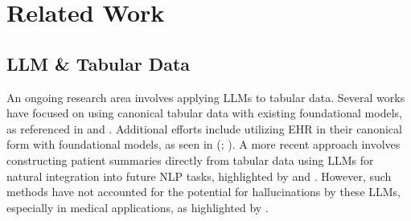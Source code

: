 \documentclass[pmlr]{jmlr}%
\begin{document}


\section{Related Work}

\subsection{LLM \& Tabular Data}

An ongoing research area involves applying LLMs to tabular data. Several works have focused on using canonical tabular data with existing foundational models, as referenced in \citep{zhang2023towards} and \citep{slack2023tablet}. Additional efforts include utilizing EHR in their canonical form with foundational models, as seen in (\cite{shi2024ehragent}; \cite{wang2023meditab}). A more recent approach involves constructing patient summaries directly from tabular data using LLMs for natural integration into future NLP tasks, highlighted by \citep{ellershaw2024automated} and \citep{hegselmann2024data}. However, such methods have not accounted for the potential for hallucinations by these LLMs, especially in medical applications, as highlighted by \citep{lee2024large}.
\end{document}
